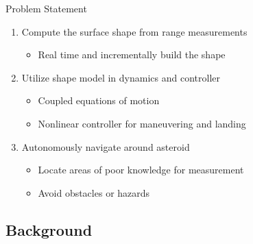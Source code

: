 \begin{frame}{Problem Statement}
\begin{enumerate}
    \item<1-> Compute the surface shape from range measurements
        \begin{itemize}
            \item Real time and incrementally build the shape
        \end{itemize}
    \item<2-> Utilize shape model in dynamics and controller
        \begin{itemize}
            \item Coupled equations of motion 
            \item Nonlinear controller for maneuvering and landing
        \end{itemize}
    \item<3-> Autonomously navigate around asteroid 
        \begin{itemize}
            \item Locate areas of poor knowledge for measurement
            \item Avoid obstacles or hazards
        \end{itemize}
\end{enumerate}
\end{frame}

\subsection{Background}

